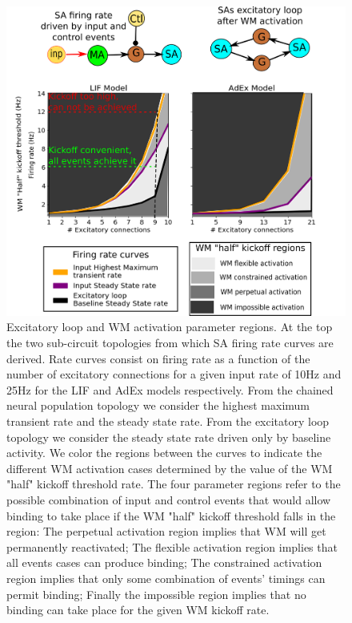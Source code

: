 \documentclass[10pt]{article}
\begin{document}
\begin{figure}[h!]
  \begin{center}
    \includegraphics[width=1.\columnwidth]{figures/parameter_regions}

    \caption{Excitatory loop and WM activation parameter regions.
At the top the two sub-circuit topologies from which SA firing rate curves are derived.
Rate curves consist on firing rate as a function of the number of excitatory connections for a given input rate of 10Hz and 25Hz for the LIF and AdEx models respectively.
From the chained neural population topology we consider the highest maximum transient rate and the steady state rate.
From the excitatory loop topology we consider the steady state rate driven only by baseline activity.
We color the regions between the curves to indicate the different WM activation cases determined by the value of the WM "half" kickoff threshold rate.
The four parameter regions refer to the possible combination of input and control events that would allow binding to take place if the WM "half" kickoff threshold falls in the region:
The perpetual activation region implies that WM will get permanently reactivated;
The flexible activation region implies that all events cases can produce binding;
The constrained activation region implies that only some combination of events' timings can permit binding;
Finally the impossible region implies that no binding can take place for the given WM kickoff rate.}
    \label{fig:experiment-3}

  \end{center}
\end{figure}
\end{document}

